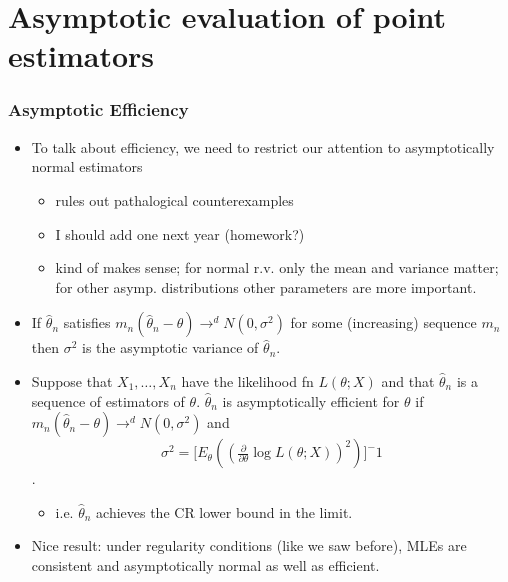 

\part*{Asymptotic evaluation of point estimators}%

\section{Asymptotic Efficiency}

\begin{itemize}
\item To talk about efficiency, we need to restrict our attention to
      asymptotically normal estimators
\begin{itemize}
\item rules out pathalogical counterexamples
\item I should add one next year (homework?)
\item kind of makes sense; for normal r.v. only the mean and
        variance matter; for other asymp. distributions other
        parameters are more important.
\end{itemize}
\item If $\hat\theta_n$ satisfies $m_n (\hat\theta_n - \theta) \to^d
      N(0, \sigma^2)$ for some (increasing) sequence $m_n$ then
      $\sigma^2$ is the asymptotic variance of $\hat\theta_n$.
\item Suppose that $X_1,\dots,X_n$ have the likelihood fn $L(\theta;
      X)$ and that $\hat\theta_n$ is a sequence of estimators of
      $\theta$.  $\hat\theta_n$ is asymptotically efficient for
      $\theta$ if $m_n (\hat\theta_n - \theta) \to^d N(0, \sigma^2)$
      and 
      \[\sigma^2 = \Big[E_\theta ((\tfrac{\partial}{\partial \theta} \log L(\theta; X))^2)\big]^-1\].
\begin{itemize}
\item i.e. $\hat\theta_n$ achieves the CR lower bound in the limit.
\end{itemize}
\item Nice result: under regularity conditions (like we saw before),
      MLEs are consistent and asymptotically normal as well as
      efficient.
\end{itemize}

